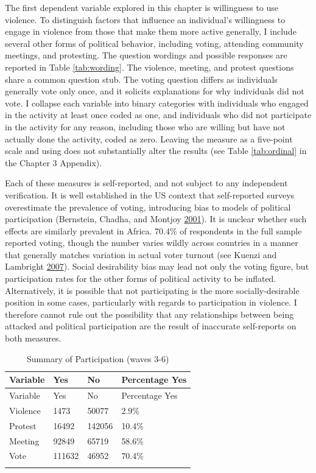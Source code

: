 \documentclass[12pt,]{book}
\theoremstyle{definition}
\theoremstyle{definition}
\theoremstyle{definition}
\theoremstyle{remark}
\begin{document}
The first dependent variable explored in this chapter is willingness to
use violence. To distinguish factors that influence an individual's
willingness to engage in violence from those that make them more active
generally, I include several other forms of political behavior,
including voting, attending community meetings, and protesting. The
question wordings and possible responses are reported in Table
\ref{tab:wording}. The violence, meeting, and protest questions share a
common question stub. The voting question differs as individuals
generally vote only once, and it solicits explanations for why
individuals did not vote. I collapse each variable into binary
categories with individuals who engaged in the activity at least once
coded as one, and individuals who did not participate in the activity
for any reason, including those who are willing but have not actually
done the activity, coded as zero. Leaving the measure as a five-point
scale and using does not substantially alter the results (see Table
\ref{tab:ordinal} in the Chapter 3 Appendix).

Each of these measures is self-reported, and not subject to any
independent verification. It is well established in the US context that
self-reported surveys overestimate the prevalence of voting, introducing
bias to models of political participation (Bernstein, Chadha, and
Montjoy \protect\hyperlink{ref-Bernstein2001}{2001}). It is unclear
whether such effects are similarly prevalent in Africa. 70.4\% of
respondents in the full sample reported voting, though the number varies
wildly across countries in a manner that generally matches variation in
actual voter turnout (see Kuenzi and Lambright
\protect\hyperlink{ref-Kuenzi2007}{2007}). Social desirability bias may
lead not only the voting figure, but participation rates for the other
forms of political activity to be inflated. Alternatively, it is
possible that not participating is the more socially-desirable position
in some cases, particularly with regards to participation in violence. I
therefore cannot rule out the possibility that any relationships between
being attacked and political participation are the result of inaccurate
self-reports on both measures.

\begin{longtable}[]{@{}llll@{}}
\tabularnewline
\toprule
Variable & Yes & No & Percentage Yes\tabularnewline
\midrule
\endfirsthead
\toprule
Variable & Yes & No & Percentage Yes\tabularnewline
\midrule
\endhead
Violence & 1473 & 50077 & 2.9\%\tabularnewline
Protest & 16492 & 142056 & 10.4\%\tabularnewline
Meeting & 92849 & 65719 & 58.6\%\tabularnewline
Vote & 111632 & 46952 & 70.4\%\tabularnewline
\bottomrule
\caption{\label{tab:descriptive} Summary of Participation (waves
3-6)}
\end{longtable}
\end{document}

